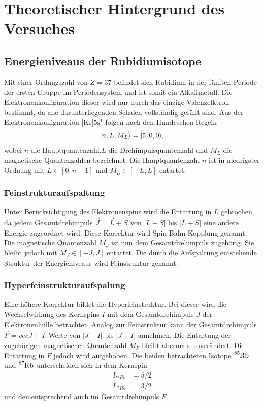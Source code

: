 \section{Theoretischer Hintergrund des Versuches}
\label{sec:Theorie}
\subsection{Energieniveaus der Rubidiumisotope}
Mit einer Ordungszahl von $Z=\num{37}$ befindet sich Rubidium in der 
fünften Periode der ersten Gruppe im Periodensystem und ist somit ein
Alkalimetall. Die Elektronenkonfiguration dieser wird nur durch 
das einzige Valenzelktron bestimmt, da alle darunterliegenden Schalen
vollständig gefüllt sind. Aus der Elektronenkonfiguration 
$\text{[Kr]}5\text{s}^1$ folgen nach den Hundeschen Regeln
\begin{equation*}
    \lvert {n,L,M_L} \rangle=\lvert {5,0,0} \rangle,
\end{equation*}
wobei $n$ die Hauptquantenzahl,$L$ die Drehimpulsquantenzahl
und $M_L$ die magnetische Quantenzahlen bezeichnet. Die 
Hauptquantenzahl $n$ ist in niedrigster Ordnung mit $L\in [0,n-1]$ und 
$M_L\in[-L,L]$ entartet. 

\subsubsection{Feinstrukturaufspaltung}
Unter Berücksichtigung des Elektronenspins
wird die Entartung in $L$ gebrochen, da jedem Gesamtdrehimpuls 
$\vec{J}=\vec{L}+\vec{S}$ von 
$|L-S|$ bis $|L+S|$ eine andere Energie zugeordnet wird. Diese 
Korrektur wird Spin-Bahn-Kopplung genannt. Die magnetische Quantenzahl
$M_J$ ist nun dem Gesamtdrehimpuls zugehörig. Sie bleibt jedoch mit 
$M_J\in[-J,J]$ entartet. Die durch die Aufspaltung entstehende Struktur
der Energieniveaus wird Feinstruktur genannt. 

\subsubsection{Hyperfeinstrukturaufspalung}
Eine höhere Korrektur bildet die Hyperfeinstruktur. Bei dieser wird 
die Wechselwirkung des Kernspins $I$ mit dem Gesamtdrehimpuls $J$ der
Elektronenhülle betrachtet. Analog zur Feinstruktur kann der Gesamtdrehimpuls
$\vec{F}=vec{J}+\vec{I}$ Werte von $|J-I|$ bis $|J+I|$ annehmen. 
Die Entartung der zugehörigen magnetischen Quantenzahl $M_F$ bleibt
abermals unverändert. Die Entartung in $F$ jedoch wird aufgehoben. 
Die beiden betrachteten Isotope $\ce{^{85}Rb}$ und $\ce{^{87}Rb}$
unterscheiden sich in dem Kernspin
\begin{align*}
    I_{^{85}Rb}&=5/2\\
    I_{^{87}Rb}&=3/2
\end{align*}
und dementsprechend auch im Gesamtdrehimpuls $F$.

